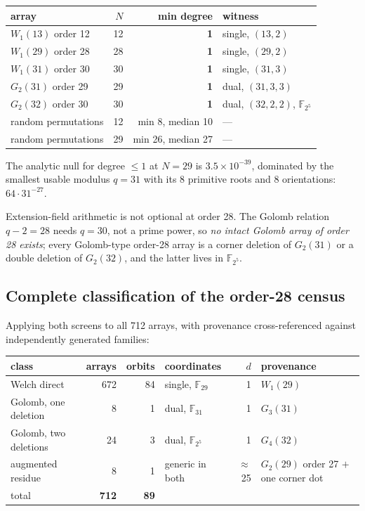 \documentclass[11pt,a4paper]{article}
\theoremstyle{definition}
\newcommand{\F}{\mathbb{F}}
\begin{document}
\begin{center}
\begin{tabular}{@{}lrrl@{}}
\toprule
array & $N$ & min degree & witness \\
\midrule
$W_1(13)$ order 12 & 12 & \textbf{1} & single, $(13,2)$ \\
$W_1(29)$ order 28 & 28 & \textbf{1} & single, $(29,2)$ \\
$W_1(31)$ order 30 & 30 & \textbf{1} & single, $(31,3)$ \\
$G_2(31)$ order 29 & 29 & \textbf{1} & dual, $(31,3,3)$ \\
$G_2(32)$ order 30 & 30 & \textbf{1} & dual, $(32,2,2)$, $\F_{2^5}$ \\
random permutations & 12 & min 8, median 10 & --- \\
random permutations & 29 & min 26, median 27 & --- \\
\bottomrule
\end{tabular}
\end{center}

The analytic null for degree $\le1$ at $N=29$ is $3.5\times10^{-39}$, dominated by
the smallest usable modulus $q=31$ with its 8 primitive roots and 8 orientations:
$64\cdot31^{-27}$.

Extension-field arithmetic is not optional at order 28. The Golomb relation
$q-2=28$ needs $q=30$, not a prime power, so \emph{no intact Golomb array of order
28 exists}; every Golomb-type order-28 array is a corner deletion of $G_2(31)$ or
a double deletion of $G_2(32)$, and the latter lives in $\F_{2^5}$.

\subsection{Complete classification of the order-28 census}

Applying both screens to all 712 arrays, with provenance cross-referenced against
independently generated families:

\begin{center}
\begin{tabular}{@{}lrrlrl@{}}
\toprule
class & arrays & orbits & coordinates & $d$ & provenance \\
\midrule
Welch direct & 672 & 84 & single, $\F_{29}$ & 1 & $W_1(29)$ \\
Golomb, one deletion & 8 & 1 & dual, $\F_{31}$ & 1 & $G_3(31)$ \\
Golomb, two deletions & 24 & 3 & dual, $\F_{2^5}$ & 1 & $G_4(32)$ \\
augmented residue & 8 & 1 & generic in both & $\approx$25 & $G_2(29)$ order 27 $+$ one corner dot \\
\midrule
total & \textbf{712} & \textbf{89} & & & \\
\bottomrule
\end{tabular}
\end{center}
\end{document}
